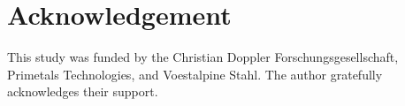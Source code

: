 \chapter*{Acknowledgement}
\label{cap:acknowledgement}
This study was funded by the Christian Doppler Forschungsgesellschaft, Primetals
Technologies, and Voestalpine Stahl. The author gratefully acknowledges their
support.
